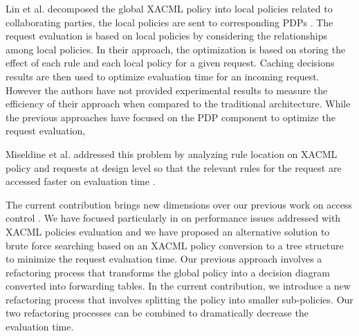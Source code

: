 Lin et al. decomposed the global XACML policy into local policies related to collaborating parties, the local policies 
are sent to corresponding PDPs \cite{decomposition}. The request evaluation is based on local policies by considering the relationships among local
 policies. In their approach, the optimization is based on storing the effect of each rule and each local policy for 
a given request. Caching decisions results are then used to optimize evaluation time for an incoming request. However the authors have 
not provided experimental results to measure the efficiency of their approach when compared to the traditional architecture.  
While the previous approaches have focused on the PDP component to optimize the request evaluation, 


Miseldine et al. addressed this problem by analyzing rule location on XACML policy and requests at design level so that the relevant rules for the request are accessed faster on evaluation time \cite{XACMLstructure}. 


The current contribution brings new dimensions over our previous work on access control \cite{Xengine} \cite{testcase} \cite{models}.
We have focused particularly in \cite{Xengine} on performance issues addressed with XACML policies evaluation and we have proposed an 
alternative solution to brute force searching based on an XACML policy conversion to a tree structure to minimize the request evaluation time. 
Our previous approach involves a refactoring process that transforms the global policy into a decision diagram converted into 
forwarding tables. In the current contribution, we introduce a new refactoring process that involves splitting the policy into smaller sub-policies. Our 
two refactoring processes can be combined to dramatically decrease the evaluation time. 
